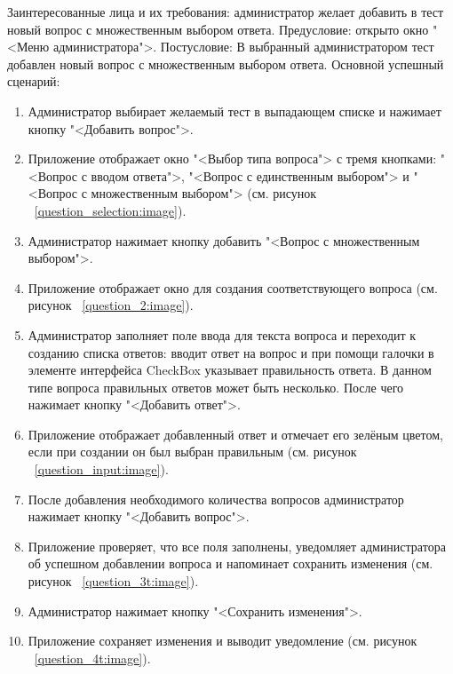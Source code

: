 Заинтересованные лица и их требования: администратор желает добавить в тест новый вопрос с множественным выбором ответа.
\newline Предусловие: открыто окно "<Меню администратора">.
\newline Постусловие: В выбранный администратором тест добавлен новый вопрос с множественным выбором ответа.
\newline Основной успешный сценарий:
\begin{enumerate}
	\item Администратор выбирает желаемый тест в выпадающем списке и нажимает кнопку "<Добавить вопрос">.
	\item Приложение отображает окно "<Выбор типа вопроса"> с тремя кнопками: "<Вопрос с вводом ответа">, "<Вопрос с единственным выбором"> и "<Вопрос с множественным выбором"> (см. рисунок ~\ref{question_selection:image}).
	\item Администратор нажимает кнопку добавить "<Вопрос с множественным выбором">.
	\item Приложение отображает окно для создания соответствующего вопроса (см. рисунок ~\ref{question_2:image}).
	\item Администратор заполняет поле ввода для текста вопроса и переходит к созданию списка ответов: вводит ответ на вопрос и при помощи галочки в элементе интерфейса CheckBox указывает правильность ответа. В данном типе вопроса правильных ответов может быть несколько. После чего нажимает кнопку "<Добавить ответ">.
	\item Приложение отображает добавленный ответ и отмечает его зелёным цветом, если при создании он был выбран правильным (см. рисунок ~\ref{question_input:image}).
	\item После добавления необходимого количества вопросов администратор нажимает кнопку "<Добавить вопрос">.
	\item Приложение проверяет, что все поля заполнены, уведомляет администратора об успешном добавлении вопроса и напоминает сохранить изменения (см. рисунок ~\ref{question_3t:image}).
	\item Администратор нажимает кнопку "<Сохранить изменения">.
	\item Приложение сохраняет изменения и выводит уведомление (см. рисунок ~\ref{question_4t:image}).
\end{enumerate}

